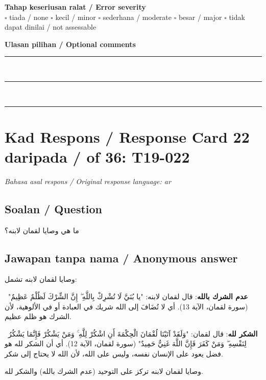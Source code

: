 \documentclass[11pt,a4paper]{article}
\newcommand{\ar}[1]{{\arabicfont #1}}
\begin{document}
\medskip
\textbf{Tahap keseriusan ralat / Error severity}\\
$\square$ tiada / none \quad $\square$ kecil / minor \quad $\square$ sederhana / moderate \quad
$\square$ besar / major \quad $\square$ tidak dapat dinilai / not assessable

\medskip
\textbf{Ulasan pilihan / Optional comments}\\[3pt]
\rule{\textwidth}{0.4pt}\\[16pt]
\rule{\textwidth}{0.4pt}\\[16pt]
\rule{\textwidth}{0.4pt}

\newpage
\section*{Kad Respons / Response Card 22 daripada / of 36: T19-022}
\textit{Bahasa asal respons / Original response language: ar}

\subsection*{Soalan / Question}
\ar{ما} \ar{هي} \ar{وصايا} \ar{لقمان} \ar{لابنه؟}

\subsection*{Jawapan tanpa nama / Anonymous answer}
\ar{وصايا} \ar{لقمان} \ar{لابنه} \ar{تشمل}:\par\medskip \textbullet\ \textbf{\ar{عدم} \ar{الشرك} \ar{بالله}}: \ar{قال} \ar{لقمان} \ar{لابنه}: "\ar{يا} \ar{بُنَيَّ} \ar{لَا} \ar{تُشْرِكْ} \ar{بِاللَّهِ} \ar{ۖ} \ar{إِنَّ} \ar{الشِّرْكَ} \ar{لَظُلْمٌ} \ar{عَظِيمٌ}" (\ar{سورة} \ar{لقمان،} \ar{الآية} 13). \ar{أي} \ar{لا} \ar{تُضَافَ} \ar{إلى} \ar{الله} \ar{شريك} \ar{في} \ar{العبادة} \ar{أو} \ar{في} \ar{الألوهية،} \ar{لأن} \ar{الشرك} \ar{هو} \ar{ظلم} \ar{عظيم}.\par\medskip \textbullet\ \textbf{\ar{الشكر} \ar{لله}}: \ar{قال} \ar{لقمان}: "\ar{وَلَقَدْ} \ar{آتَيْنَا} \ar{لُقْمَانَ} \ar{الْحِكْمَةَ} \ar{أَنِ} \ar{اشْكُرْ} \ar{لِلَّهِ} \ar{ۚ} \ar{وَمَنْ} \ar{يَشْكُرْ} \ar{فَإِنَّمَا} \ar{يَشْكُرُ} \ar{لِنَفْسِهِ} \ar{ۖ} \ar{وَمَنْ} \ar{كَفَرَ} \ar{فَإِنَّ} \ar{اللَّهَ} \ar{غَنِيٌّ} \ar{حَمِيدٌ}" (\ar{سورة} \ar{لقمان،} \ar{الآية} 12). \ar{أي} \ar{أن} \ar{الشكر} \ar{لله} \ar{هو} \ar{فضل} \ar{يعود} \ar{على} \ar{الإنسان} \ar{نفسه،} \ar{وليس} \ar{على} \ar{الله،} \ar{لأن} \ar{الله} \ar{لا} \ar{يحتاج} \ar{إلى} \ar{شكر}.\par\medskip \ar{إذن،} \ar{وصايا} \ar{لقمان} \ar{لابنه} \ar{تركز} \ar{على} \ar{التوحيد} (\ar{عدم} \ar{الشرك} \ar{بالله}) \ar{والشكر} \ar{لله}.
\end{document}
